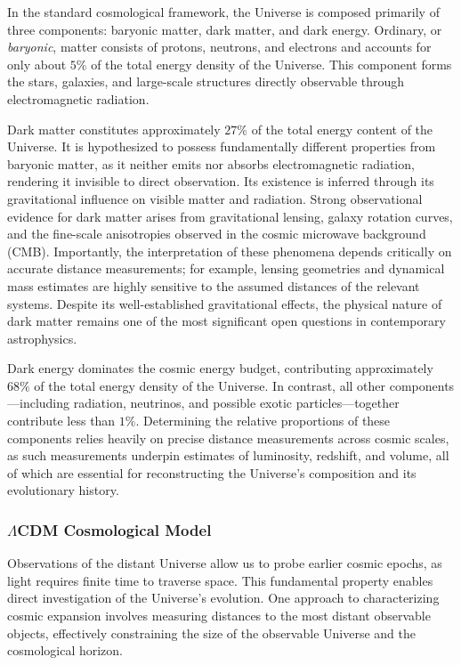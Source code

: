 

In the standard cosmological framework, the Universe is composed primarily of three components: baryonic matter, dark matter, and dark energy. Ordinary, or \emph{baryonic}, matter consists of protons, neutrons, and electrons and accounts for only about $5\%$ of the total energy density of the Universe. This component forms the stars, galaxies, and large-scale structures directly observable through electromagnetic radiation.

Dark matter constitutes approximately $27\%$ of the total energy content of the Universe. It is hypothesized to possess fundamentally different properties from baryonic matter, as it neither emits nor absorbs electromagnetic radiation, rendering it invisible to direct observation. Its existence is inferred through its gravitational influence on visible matter and radiation. Strong observational evidence for dark matter arises from gravitational lensing, galaxy rotation curves, and the fine-scale anisotropies observed in the cosmic microwave background (CMB). Importantly, the interpretation of these phenomena depends critically on accurate distance measurements; for example, lensing geometries and dynamical mass estimates are highly sensitive to the assumed distances of the relevant systems. Despite its well-established gravitational effects, the physical nature of dark matter remains one of the most significant open questions in contemporary astrophysics.

Dark energy dominates the cosmic energy budget, contributing approximately $68\%$ of the total energy density of the Universe. In contrast, all other components---including radiation, neutrinos, and possible exotic particles---together contribute less than $1\%$. Determining the relative proportions of these components relies heavily on precise distance measurements across cosmic scales, as such measurements underpin estimates of luminosity, redshift, and volume, all of which are essential for reconstructing the Universe’s composition and its evolutionary history.

\subsubsection{$\Lambda$CDM Cosmological Model}

Observations of the distant Universe allow us to probe earlier cosmic epochs, as light requires finite time to traverse space. This fundamental property enables direct investigation of the Universe’s evolution. One approach to characterizing cosmic expansion involves measuring distances to the most distant observable objects, effectively constraining the size of the observable Universe and the cosmological horizon.

